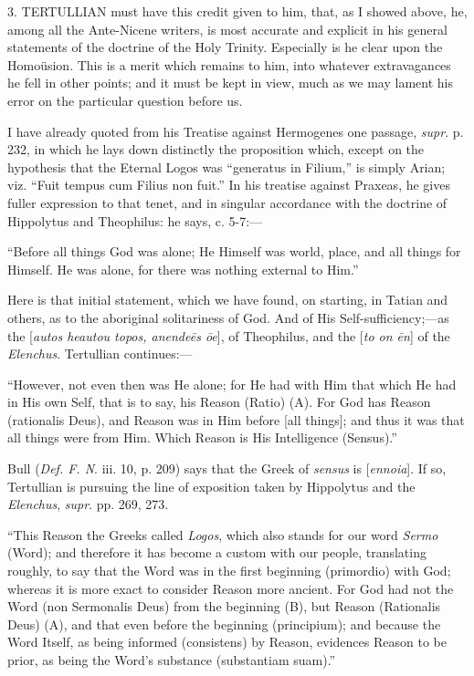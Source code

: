 3. TERTULLIAN must have this credit given to
him, that, as I showed above, he, among all the Ante-Nicene writers,
is most accurate and explicit in his general statements of the
doctrine of the Holy Trinity. Especially is he clear upon the
Homoüsion. This is a merit which remains to him, into whatever
extravagances he fell in other points; and it must be kept in view,
much as we may lament his error on the particular question before us.

I have already quoted from his Treatise against Hermogenes one
passage, \emph{supr}. p. 232, in which he lays down distinctly the
proposition which, except on the hypothesis that the Eternal Logos was
``generatus in Filium,'' is simply Arian; viz. ``Fuit
tempus cum Filius non fuit.'' In his treatise against Praxeas, he
gives fuller expression to that tenet, and in singular accordance with
the doctrine of Hippolytus and Theophilus: he says, c. 5-7:—

``Before all things God was alone; He Himself was world, place,
and all things for Himself. He was alone, for there was nothing
external to Him.''

Here is that initial statement, which we have found, on starting,
in Tatian and others, as to the aboriginal solitariness of God. And of
His Self-sufficiency;—as the [\emph{autos heautou topos, anende\={e}s
\={o}e}], of Theophilus, and the [\emph{to on \={e}n}] of the
\emph{Elenchus}. Tertullian continues:—

``However, not even then was He alone; for He had with Him that
which He had in His own Self, that is to say, his Reason (Ratio) (A).
For God has Reason (rationalis Deus), and Reason was in Him before
[all things]; and thus it was that all things were from Him. Which
Reason is His Intelligence (Sensus).''

Bull (\emph{Def. F. N}. iii. 10, p. 209) says that the Greek of \emph{sensus}
is [\emph{ennoia}]. If so, Tertullian is pursuing the line of
exposition taken by Hippolytus and the \emph{Elenchus}, \emph{supr}.
pp. 269, 273.

``This Reason the Greeks called \emph{Logos}, which also stands
for our word \emph{Sermo} (Word); and therefore it has become a custom
with our people, translating roughly, to say that the Word was in the
first beginning (primordio) with God; whereas it is more exact
to consider Reason more ancient. For God had not the Word (non
Sermonalis Deus) from the beginning (B), but Reason (Rationalis Deus)
(A), and that even before the beginning (principium); and because the
Word Itself, as being informed (consistens) by Reason, evidences
Reason to be prior, as being the Word's substance (substantiam suam).''

